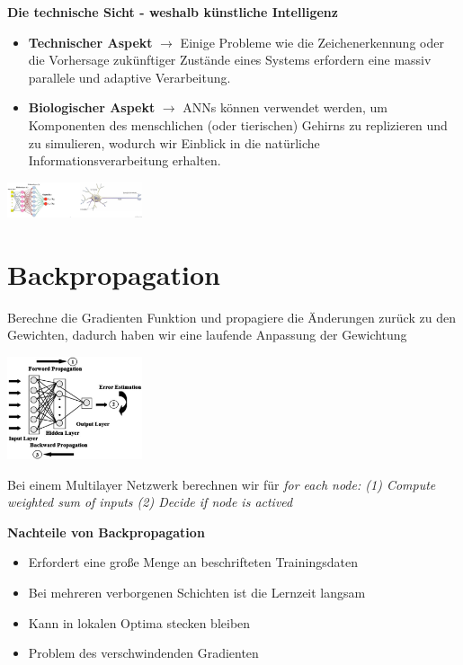 \documentclass{article}
\newenvironment{Figure}
	{\par\medskip\noindent\minipage{\linewidth}}
	{\endminipage\par\medskip}
\theoremstyle{merke}
\theoremstyle{definition}
\begin{document}
    \textbf{Die technische Sicht - weshalb künstliche Intelligenz}
    \begin{itemize}
        \item \textbf{Technischer Aspekt} $\rightarrow$ Einige Probleme wie die Zeichenerkennung oder die Vorhersage zukünftiger Zustände eines Systems erfordern eine massiv parallele und adaptive Verarbeitung.
        \item \textbf{Biologischer Aspekt} $\rightarrow$ ANNs können verwendet werden, um Komponenten des menschlichen (oder tierischen) Gehirns zu replizieren und zu simulieren, wodurch wir Einblick in die natürliche Informationsverarbeitung erhalten.
    \end{itemize}
    \begin{Figure}
    \centering
    \includegraphics[width=150px]{img/technicalVsBiological.png}
        \label{fig:Abbildung zum Vergleich der Informatik zur Biologie}
    \end{Figure}

    \section{Backpropagation}
    Berechne die Gradienten Funktion und propagiere die Änderungen zurück zu den Gewichten, dadurch haben wir eine laufende Anpassung der Gewichtung
    \begin{Figure}
    \centering
    \includegraphics[width=150px]{img/Backpropagation.png}
        \label{fig:Abbildung des Backpropagation-Prozedere}
    \end{Figure}

    Bei einem Multilayer Netzwerk berechnen wir für \textit{for each node: (1) Compute weighted sum of inputs (2) Decide if node is actived}

    \textbf{Nachteile von Backpropagation}
    \begin{itemize}
        \item Erfordert eine große Menge an beschrifteten Trainingsdaten
        \item Bei mehreren verborgenen Schichten ist die Lernzeit langsam
        \item Kann in lokalen Optima stecken bleiben
        \item Problem des verschwindenden Gradienten
    \end{itemize}
\end{document}
